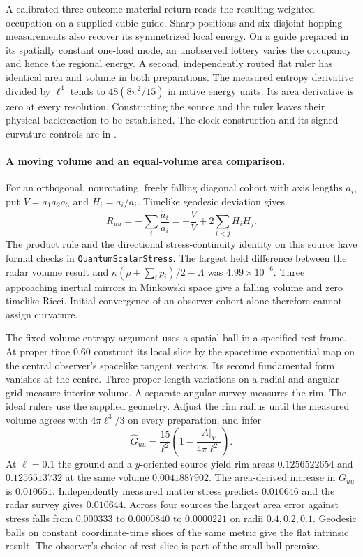 \documentclass[11pt]{article}
\begin{document}
A calibrated three-outcome material return reads the resulting
weighted occupation on a supplied cubic guide. Sharp positions and
six disjoint hopping measurements also recover its symmetrized local
energy. On a guide prepared in its spatially constant one-load mode,
an unobserved lottery varies the occupancy and hence the regional
energy. A second, independently routed flat ruler has identical area
and volume in both preparations. The measured entropy derivative
divided by $\ell^4$ tends to $48(8\pi^2/15)$ in native energy units.
Its area derivative is zero at every resolution. Constructing the
source and the ruler leaves their physical backreaction to be
established. The clock construction and its signed curvature controls
are in .

\paragraph{A moving volume and an equal-volume area comparison.}
For an orthogonal, nonrotating, freely falling diagonal cohort with
axis lengths $a_i$, put $V=a_1a_2a_3$ and $H_i=\dot a_i/a_i$.
Timelike geodesic deviation gives
\[
 R_{uu}=-\sum_i \frac{\ddot a_i}{a_i}
       =-\frac{\ddot V}{V}+2\sum_{i<j}H_iH_j .
\]
The product rule and the directional stress-continuity identity on this
source have formal checks in \texttt{QuantumScalarStress}. The largest
held difference between the radar volume result and
$\kappa(\rho+\sum_i p_i)/2-\Lambda$ was $4.99\times10^{-6}$.
Three approaching inertial mirrors in Minkowski space give a falling
volume and zero timelike Ricci. Initial convergence of an observer
cohort alone therefore cannot assign curvature.

The fixed-volume entropy argument uses a spatial ball in a specified
rest frame. At proper time $0.60$ construct its local slice by the
spacetime exponential map on the central observer's spacelike tangent
vectors. Its second fundamental form vanishes at the centre. Three
proper-length variations on a radial and angular grid measure interior
volume. A separate angular survey measures the rim. The ideal rulers
use the supplied geometry. Adjust the rim radius until the measured
volume agrees with $4\pi\ell^3/3$ on every preparation, and infer
\[
 \widehat G_{uu}=\frac{15}{\ell^2}
                   \left(1-\frac{A|_V}{4\pi\ell^2}\right).
\]
At $\ell=0.1$ the ground and a $y$-oriented source yield rim areas
$0.1256522654$ and $0.1256513732$ at the same volume $0.0041887902$.
The area-derived increase in $G_{uu}$ is $0.010651$. Independently
measured matter stress predicts $0.010646$ and the radar survey gives
$0.010644$. Across four sources the largest area error against stress
falls from $0.000333$ to $0.0000840$ to $0.0000221$ on radii
$0.4,0.2,0.1$. Geodesic balls on constant coordinate-time slices of
the same metric give the flat intrinsic result. The observer's choice
of rest slice is part of the small-ball premise.
\end{document}
